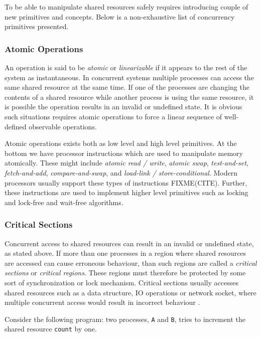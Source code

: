 To be able to manipulate shared resources safely requires introducing couple of new primitives and concepts. Below is a non-exhaustive list of concurrency primitives presented.


\subsubsection{Atomic Operations}

An operation is said to be \textit{atomic} or \textit{linearizable} if it appears to the rest of the system as instantaneous. In concurrent systems multiple processes can access the same shared resource at the same time. If one of the processes are changing the contents of a shared resource while another process is using the same resource, it is possible the operation results in an invalid or undefined state. It is obvious such situations requires atomic operations to force a linear sequence of well\hyp{}defined observable operations. 

Atomic operations exists both as low level and high level primitives. At the bottom we have processor instructions which are used to manipulate memory atomically. These might include \textit{atomic read / write}, \textit{atomic swap}, \textit{test\hyp{}and\hyp{}set}, \textit{fetch\hyp{}and\hyp{}add}, \textit{compare\hyp{}and\hyp{}swap}, and \textit{load\hyp{}link / store\hyp{}conditional}. Modern processors usually support these types of instructions FIXME(CITE). Further, these instructions are used to implement higher level primitives such as locking and lock\hyp{}free and wait\hyp{}free algorithms. 


\subsubsection{Critical Sections}

Concurrent access to shared resources can result in an invalid or undefined state, as stated above. If more than one processes in a region where shared resources are accessed can cause erroneous behaviour, than such regions are called a \textit{critical sections} or \textit{critical regions}. These regions must therefore be protected by some sort of synchronization or lock mechanism. Critical sections usually accesses shared resources such as a data structure, IO operations or network socket, where multiple concurrent access would result in incorrect behaviour \citep{raynal2012concurrent}.

Consider the following program: two processes, \texttt{A} and \texttt{B}, tries to increment the shared resource \texttt{count} by one. 

